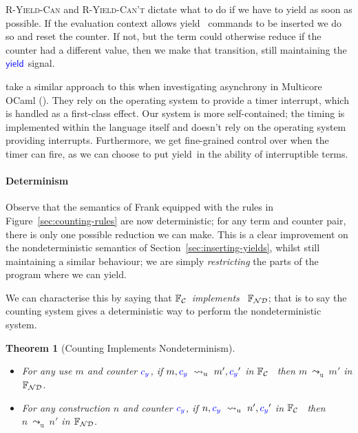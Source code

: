 \documentclass[msc,deptreport,cs]{infthesis} %
\newtheorem{theorem}{Theorem}
\newcommand\nondetfrank{$\mathbb{F}_{\cal{ND}}$}
\newcommand\countingfrank{$\mathbb{F}_{\cal{C}}$}
\newcommand{\counter}{{\color{blue}c_y}}
\newcommand{\yieldc}{{\color{blue}{\textsf{yield}}}}
\newcommand\yield{\textsf{yield}\xspace}
\newcommand{\redtou}{\leadsto_{\mathrm{u}}}
\begin{document}
\textsc{R-Yield-Can} and \textsc{R-Yield-Can't} dictate what to do if we have to
yield as soon as possible. If the evaluation context allows \yield~
commands to be inserted we do so and reset the counter. If not, but the term
could otherwise reduce if the counter had a different value, then we make that
transition, still maintaining the $\yieldc$ signal.

\citeauthor{dolan2017concurrent} take a similar approach to this when
investigating asynchrony in Multicore OCaml (\cite{dolan2017concurrent}). They
rely on the operating system to provide a timer interrupt, which is handled as a
first-class effect. Our system is more self-contained; the timing is implemented
within the language itself and doesn't rely on the operating system providing
interrupts. Furthermore, we get fine-grained control over when the timer can
fire, as we can choose to put \yield~in the ability of interruptible
terms.

\paragraph*{Determinism}
Observe that the semantics of Frank equipped with the rules in
Figure~\ref{sec:counting-rules} are now deterministic; for any term and counter
pair, there is only one possible reduction we can make. This is a clear
improvement on the nondeterministic semantics of Section~\ref{sec:inserting-yields},
whilst still maintaining a similar behaviour; we are simply \emph{restricting}
the parts of the program where we can yield.

We can characterise this by saying that \countingfrank~\emph{implements}~
\nondetfrank; that is to say the counting system gives a deterministic way to
perform the nondeterministic system.

\begin{theorem}[Counting Implements Nondeterminism]
\begin{itemize}
\item For any use $m$ and counter $\counter$, if $m, \counter~\redtou~
  m',\counter'$ in \countingfrank~ then $m~\redtou~m'$ in \nondetfrank.
\item For any construction $n$ and counter $\counter$, if $n, \counter~\redtou~
  n',\counter'$ in \countingfrank~ then $n~\redtou~n'$ in \nondetfrank.
\end{itemize}
\end{theorem}
\end{document}

